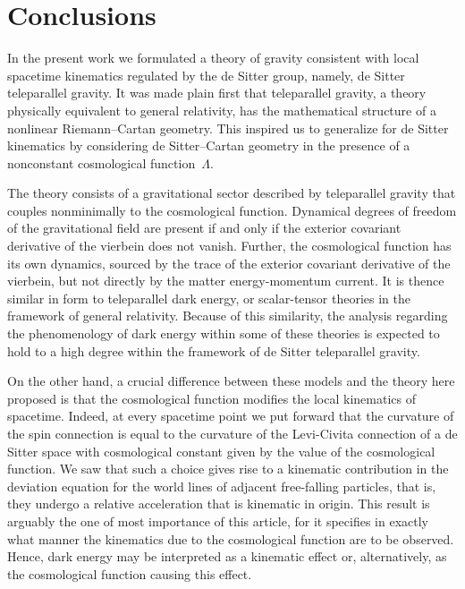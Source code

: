 \documentclass[%
5p,
times,
sort&compress
]{elsarticle}
\begin{document}
\section{Conclusions}
\label{sec:concl}

In the present work we formulated a theory of gravity consistent 
with local spacetime kinematics regulated by the de Sitter group, 
namely, de Sitter teleparallel gravity. It was made plain first 
that teleparallel gravity, a theory physically equivalent to 
general relativity, has the mathematical structure of a nonlinear 
Riemann--Cartan geometry. This inspired us to generalize for de 
Sitter kinematics by considering de Sitter--Cartan geometry in 
the presence of a nonconstant cosmological function~$\Lambda$. 

The theory consists of a gravitational sector described by 
teleparallel gravity that couples nonminimally to the 
cosmological function.  Dynamical degrees of freedom of the 
gravitational field are present if and only if the exterior 
covariant derivative of the vierbein does not vanish.  Further, 
the cosmological function has its own dynamics, sourced by the 
trace of the exterior covariant derivative of the vierbein, but 
not directly by the matter energy-momentum current.  It is thence 
similar in form to teleparallel dark energy, or scalar-tensor 
theories in the framework of general relativity. Because of this 
similarity, the analysis regarding the phenomenology of dark 
energy within some of these theories is expected to hold to 
a high degree within the framework of de Sitter teleparallel 
gravity.

On the other hand, a crucial difference between these models and 
the theory here proposed is that the cosmological function 
modifies the local kinematics of spacetime. Indeed, at every 
spacetime point we put forward that the curvature of the spin 
connection is equal to the curvature of the Levi-Civita 
connection of a de Sitter space with cosmological constant given 
by the value of the cosmological function. We saw that such 
a choice gives rise to a kinematic contribution in the deviation 
equation for the world lines of adjacent free-falling particles, 
that is, they undergo a relative acceleration that is kinematic 
in origin. This result is arguably the one of most importance of 
this article, for it specifies in exactly what manner the 
kinematics due to the cosmological function are to be observed.  
Hence, dark energy may be interpreted as a kinematic effect or, 
alternatively, as the cosmological function causing this effect.
\end{document}
